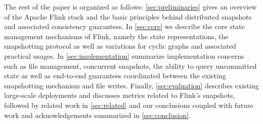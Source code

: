 The rest of the paper is organized as follows: \autoref{sec:preliminaries} gives an overview of the Apache Flink stack and the basic principles behind distributed snapshots and associated consistency guarantees. In \autoref{sec:core} we describe the core state management mechanisms of Flink, namely the state representations, the snapshotting protocol as well as variations for cyclic graphs and associated practical usages. In \autoref{sec:implementation} summarize implementation concerns such as file management, concurrent snapshots, the ability to query uncommitted state as well as end-to-end guarantees coordinated between the existing snapshotting mechanism and file writes. Finally, \autoref{sec:evaluation} describes existing large-scale deployments and discusses metrics related to Flink's snapshots, followed by related work in \autoref{sec:related} and our conclusions coupled with future work and acknowledgements summarized in \autoref{sec:conclusion}. 
